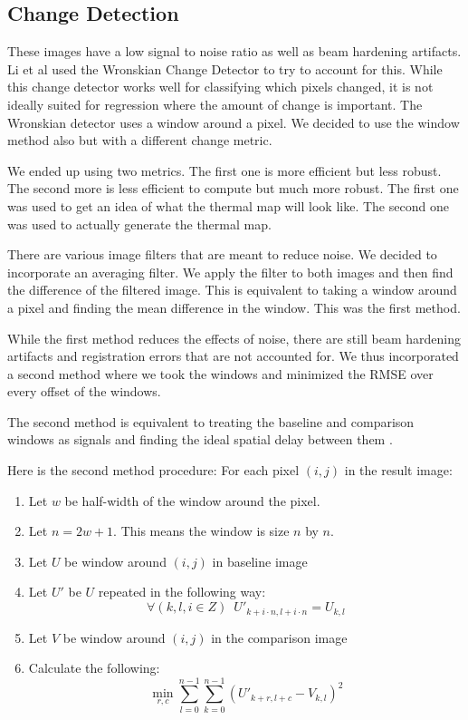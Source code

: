\documentclass[]{spie}  %
\begin{document}
\subsection{Change Detection}

These images have a low signal to noise ratio as well as beam hardening artifacts. Li et al used the Wronskian Change Detector to try to account for this. While this change detector works well for classifying which pixels changed, it is not ideally suited for regression where the amount of change is important. The Wronskian detector uses a window around a pixel. We decided to use the window method also but with a different change metric. 

We ended up using two metrics. The first one is more efficient but less robust. The second more is less efficient to compute but much more robust. The first one was used to get an idea of what the thermal map will look like. The second one was used to actually generate the thermal map. 

There are various image filters that are meant to reduce noise. We decided to incorporate an averaging filter. We apply the filter to both images and then find the difference of the filtered image. This is equivalent to taking a window around a pixel and finding the mean difference in the window. This was the first method. 

While the first method reduces the effects of noise, there are still beam hardening artifacts and registration errors that are not accounted for. We thus incorporated a second method where we took the windows and minimized the RMSE over every offset of the windows. 

The second method is equivalent to treating the baseline and comparison windows as signals and finding the ideal spatial delay between them \cite{Rhudy09}. 

Here is the second method procedure:
For each pixel $(i,j)$ in the result image:
\begin{enumerate}
\item Let $w$ be half-width of the window around the pixel. 
\item Let $n=2w+1$. This means the window is size $n$ by $n$. 
\item Let $U$ be window around $(i,j)$ in baseline image
\item Let $U'$ be $U$ repeated in the following way:
\[
\forall(k,l,i \in Z)\, \, \, U'_{k+i \cdot n,l+i \cdot n} = U_{k,l}
\]
\item Let $V$ be window around $(i,j)$ in the comparison image
\item Calculate the following:
\[
\min_{r,c} \sum_{l=0}^{n-1} \sum_{k=0}^{n-1} {(U'_{k+r,l+c}-V_{k,l})^2}
\]

\end{enumerate}
\end{document}
